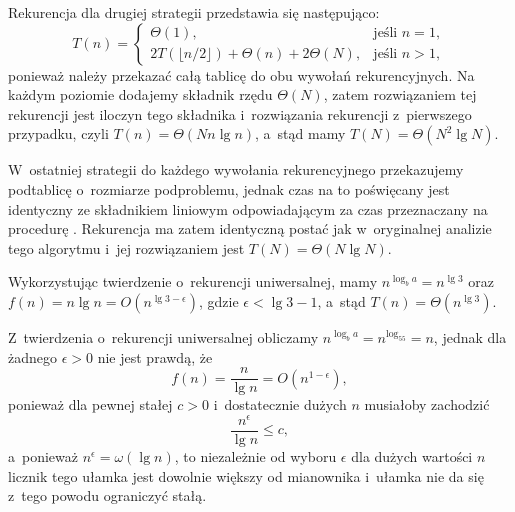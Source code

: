 Rekurencja dla drugiej strategii przedstawia się następująco:
\[
	T(n) = \begin{cases}
		\Theta(1), & \text{jeśli $n=1$}, \\
		2T(\lfloor n/2\rfloor)+\Theta(n)+2\Theta(N), & \text{jeśli $n>1$},
	\end{cases}
\]
ponieważ należy przekazać całą tablicę do obu wywołań rekurencyjnych. Na każdym poziomie dodajemy składnik rzędu $\Theta(N)$, zatem rozwiązaniem tej rekurencji jest iloczyn tego składnika i~rozwiązania rekurencji z~pierwszego przypadku, czyli $T(n)=\Theta(Nn\lg n)$, a~stąd mamy $T(N)=\Theta(N^2\lg N)$.

W~ostatniej strategii do każdego wywołania rekurencyjnego przekazujemy podtablicę o~rozmiarze podproblemu, jednak czas na to poświęcany jest identyczny ze składnikiem liniowym odpowiadającym za czas przeznaczany na procedurę . Rekurencja ma zatem identyczną postać jak w~oryginalnej analizie tego algorytmu i~jej rozwiązaniem jest $T(N)=\Theta(N\lg N)$.


\subproblem %
Wykorzystując twierdzenie o~rekurencji uniwersalnej, mamy $n^{\log_ba}=n^{\lg3}$ oraz $f(n)=n\lg n=O(n^{\lg3-\epsilon})$, gdzie $\epsilon<\lg3-1$, a~stąd $T(n)=\Theta(n^{\lg3})$.

\subproblem %
Z~twierdzenia o~rekurencji uniwersalnej obliczamy $n^{\log_ba}=n^{\log_55}=n$, jednak dla żadnego $\epsilon>0$ nie jest prawdą, że
\[
	f(n) = \frac{n}{\lg n} = O(n^{1-\epsilon}),
\]
ponieważ dla pewnej stałej $c>0$ i~dostatecznie dużych $n$ musiałoby zachodzić
\[
	\frac{n^\epsilon}{\lg n} \le c,
\]
a~ponieważ $n^\epsilon=\omega(\lg n)$, to niezależnie od wyboru $\epsilon$ dla dużych wartości $n$ licznik tego ułamka jest dowolnie większy od mianownika i~ułamka nie da się z~tego powodu ograniczyć stałą.

